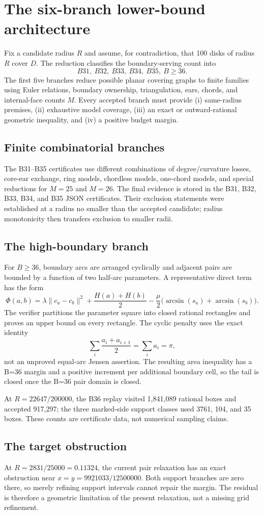 \section{The six-branch lower-bound architecture}
Fix a candidate radius $R$ and assume, for contradiction, that 100 disks of radius $R$ cover $D$. The reduction classifies the boundary-serving count into
\[
 B31,\ B32,\ B33,\ B34,\ B35,\ B\ge 36.
\]
The first five branches reduce possible planar covering graphs to finite families using Euler relations, boundary ownership, triangulation, ears, chords, and internal-face counts $M$. Every accepted branch must provide (i) same-radius premises, (ii) exhaustive model coverage, (iii) an exact or outward-rational geometric inequality, and (iv) a positive budget margin.

\subsection{Finite combinatorial branches}
The B31--B35 certificates use different combinations of degree/curvature losses, core-ear exchange, ring models, chordless models, one-chord models, and special reductions for $M=25$ and $M=26$. The final evidence is stored in the B31, B32, B33, B34, and B35 JSON certificates. Their exclusion statements were established at a radius no smaller than the accepted candidate; radius monotonicity then transfers exclusion to smaller radii.

\subsection{The high-boundary branch}
For $B\ge36$, boundary arcs are arranged cyclically and adjacent pairs are bounded by a function of two half-arc parameters. A representative direct term has the form
\[
 \Phi(a,b)=\lambda\lVert c_a-c_b\rVert^2+\frac{H(a)+H(b)}2
 -\frac\mu2\bigl(\arcsin(s_a)+\arcsin(s_b)\bigr).
\]
The verifier partitions the parameter square into closed rational rectangles and proves an upper bound on every rectangle. The cyclic penalty uses the exact identity
\[
 \sum_i\frac{a_i+a_{i+1}}2=\sum_i a_i=\pi,
\]
not an unproved equal-arc Jensen assertion. The resulting area inequality has a B=36 margin and a positive increment per additional boundary cell, so the tail is closed once the B=36 pair domain is closed.

At $R=22647/200000$, the B36 replay visited 1,841,089 rational boxes and accepted 917,297; the three marked-side support classes used 3761, 104, and 35 boxes. These counts are certificate data, not numerical sampling claims.

\subsection{The target obstruction}
At $R=2831/25000=0.11324$, the current pair relaxation has an exact obstruction near $x=y=9921033/12500000$. Both support branches are zero there, so merely refining support intervals cannot repair the margin. The residual is therefore a geometric limitation of the present relaxation, not a missing grid refinement.
